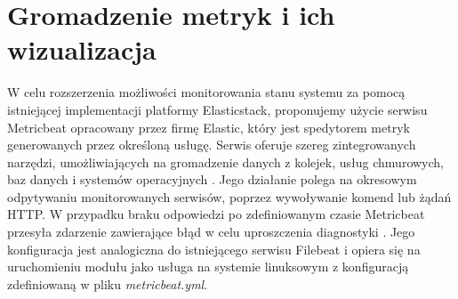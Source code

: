 \section{Gromadzenie metryk i ich wizualizacja}
W celu rozszerzenia możliwości monitorowania stanu systemu za pomocą istniejącej implementacji platformy Elasticstack, proponujemy użycie serwisu Metricbeat opracowany przez firmę Elastic, który jest spedytorem metryk generowanych przez określoną usługę. Serwis oferuje szereg zintegrowanych narzędzi, umożliwiających na gromadzenie danych z kolejek, usług chmurowych, baz danych i systemów operacyjnych \cite{metricbeat}. Jego działanie polega na okresowym odpytywaniu monitorowanych serwisów, poprzez wywoływanie komend lub żądań HTTP. W przypadku braku odpowiedzi po zdefiniowanym czasie Metricbeat przesyła zdarzenie zawierające błąd w celu uproszczenia diagnostyki \cite{metricbeat_work}. Jego konfiguracja jest analogiczna do istniejącego serwisu Filebeat i opiera się na uruchomieniu modułu jako usługa na systemie linuksowym z konfiguracją zdefiniowaną w pliku \textit{metricbeat.yml}.
